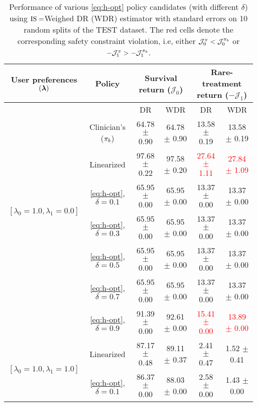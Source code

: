 \begin{table}[h]
    \centering
    \caption{
    Performance of various \ref{eq:h-opt} policy candidates (with different $\delta$) using $\text{IS}=$Weighed DR (WDR) estimator with standard errors on 10 random splits of the TEST dataset. 
    The red cells denote the corresponding safety constraint violation, i.e, either $\mathcal{J}_{0}^{\pi} < \mathcal{J}_{0}^{\pi_{b}}$ or $-\mathcal{J}_{1}^{\pi} > -\mathcal{J}_{1}^{\pi_{b}}$.}
    \label{table:app-hopt-WDR-Adv}
    \vskip 0.1in
    \begin{adjustbox}{max width=1\textwidth,center}
    \begin{tabular}{cccccc}
    \toprule
    \multicolumn{1}{c}{User preferences $(\bm{\lambda})$} & \multicolumn{1}{c}{Policy} & \multicolumn{2}{c}{Survival return ($\mathcal{J}_0$)} & \multicolumn{2}{c}{Rare-treatment return ($- \mathcal{J}_1$)} \\
    \hline
    & & DR & WDR & DR & WDR  \\  \cline{3-6}
    & Clinician's ($\pi_{b}$) & 64.78 $\pm$ 0.90 & 64.78 $\pm$ 0.90          & 13.58 $\pm$ 0.19 & 13.58 $\pm$ 0.19  \\
    \midrule
    \multirow{4}{*}{$[\lambda_0=1.0, \lambda_1 = 0.0]$} 
    & Linearized & 97.68 $\pm$ 0.22 & 97.58 $\pm$ 0.20   & \textcolor{red}{27.64 $\pm$ 1.11 }& \textcolor{red}{27.84 $\pm$ 1.09 } \\ 
    & \ref{eq:h-opt}, $\delta=0.1$  & 65.95 $\pm$ 0.00 & 65.95 $\pm$ 0.00   & 13.37 $\pm$ 0.00 & 13.37 $\pm$ 0.00\\
    & \ref{eq:h-opt}, $\delta=0.3$  & 65.95 $\pm$ 0.00 & 65.95 $\pm$ 0.00   & 13.37 $\pm$ 0.00 & 13.37 $\pm$ 0.00\\
    & \ref{eq:h-opt}, $\delta=0.5$  & 65.95 $\pm$ 0.00 & 65.95 $\pm$ 0.00   & 13.37 $\pm$ 0.00 & 13.37 $\pm$ 0.00\\
    & \ref{eq:h-opt}, $\delta=0.7$  & 65.95 $\pm$ 0.00 & 65.95 $\pm$ 0.00   & 13.37 $\pm$ 0.00 & 13.37 $\pm$ 0.00\\
    & \ref{eq:h-opt}, $\delta=0.9$  & 91.39 $\pm$ 0.00 & 92.61 $\pm$ 0.00   & \textcolor{red}{15.41 $\pm$ 0.00 }& \textcolor{red}{13.89 $\pm$ 0.00 } \\
    \midrule
    \multirow{4}{*}{$[\lambda_0=1.0, \lambda_1 = 1.0]$}
    & Linearized & 87.17 $\pm$ 0.48 & 89.11 $\pm$ 0.37   & 2.41 $\pm$ 0.47 & 1.52 $\pm$ 0.41\\
    & \ref{eq:h-opt}, $\delta=0.1$  & 86.37 $\pm$ 0.00 & 88.03 $\pm$ 0.00   & 2.58 $\pm$ 0.00 & 1.43 $\pm$ 0.00\\

\end{tabular}
\end{adjustbox}
\end{table}
